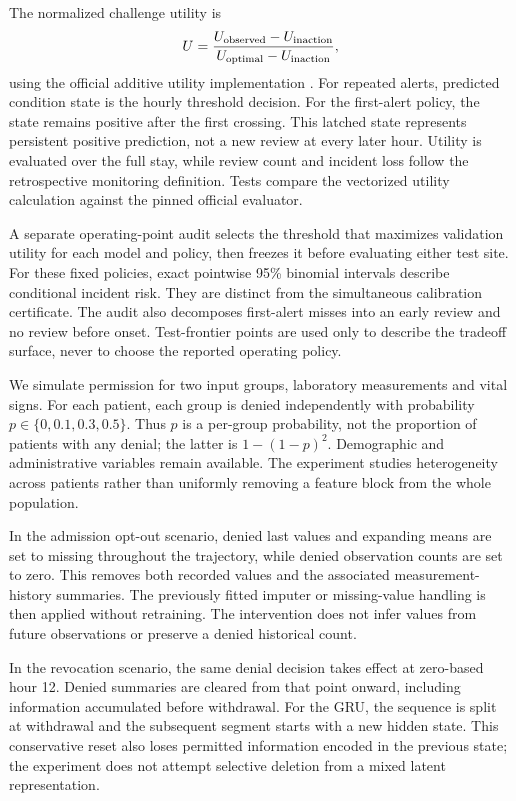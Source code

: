 The normalized challenge utility is
\begin{equation*}
 U=\frac{U_{\rm observed}-U_{\rm inaction}}
 {U_{\rm optimal}-U_{\rm inaction}},
\end{equation*}
using the official additive utility implementation \citep{reyna2020}. For repeated alerts, predicted condition state is the hourly threshold decision. For the first-alert policy, the state remains positive after the first crossing. This latched state represents persistent positive prediction, not a new review at every later hour. Utility is evaluated over the full stay, while review count and incident loss follow the retrospective monitoring definition. Tests compare the vectorized utility calculation against the pinned official evaluator.

A separate operating-point audit selects the threshold that maximizes validation utility for each model and policy, then freezes it before evaluating either test site. For these fixed policies, exact pointwise 95\% binomial intervals describe conditional incident risk. They are distinct from the simultaneous calibration certificate. The audit also decomposes first-alert misses into an early review and no review before onset. Test-frontier points are used only to describe the tradeoff surface, never to choose the reported operating policy.

We simulate permission for two input groups, laboratory measurements and vital signs. For each patient, each group is denied independently with probability $p\in\{0,0.1,0.3,0.5\}$. Thus $p$ is a per-group probability, not the proportion of patients with any denial; the latter is $1-(1-p)^2$. Demographic and administrative variables remain available. The experiment studies heterogeneity across patients rather than uniformly removing a feature block from the whole population.

In the admission opt-out scenario, denied last values and expanding means are set to missing throughout the trajectory, while denied observation counts are set to zero. This removes both recorded values and the associated measurement-history summaries. The previously fitted imputer or missing-value handling is then applied without retraining. The intervention does not infer values from future observations or preserve a denied historical count.

In the revocation scenario, the same denial decision takes effect at zero-based hour 12. Denied summaries are cleared from that point onward, including information accumulated before withdrawal. For the GRU, the sequence is split at withdrawal and the subsequent segment starts with a new hidden state. This conservative reset also loses permitted information encoded in the previous state; the experiment does not attempt selective deletion from a mixed latent representation.

